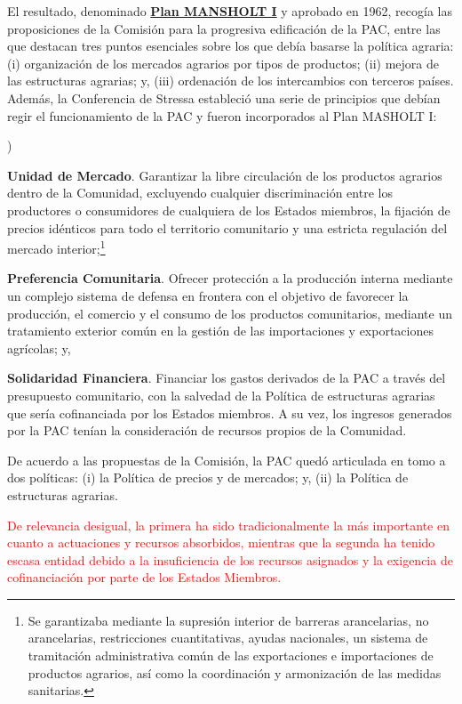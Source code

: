 \documentclass[10pt,a4paper]{article}
\newcounter{alphaitem}
\newenvironment{la}
      {\begin{list}{\alph{alphaitem})}{%
          \usecounter{alphaitem}%
          \setlength{\leftmargin}{1cm}%
          \setlength{\parskip}{3pt}%
          \setlength{\itemsep}{0pt}%
          \setlength{\parsep}{0pt}%
      }}
      {\end{list}}
\begin{document}
El resultado, denominado \href{https://www.mapa.gob.es/ministerio/pags/biblioteca/fondo/pdf/4102_10.pdf}{\textbf{Plan MANSHOLT I}} y aprobado en 1962, recogía las proposiciones de la Comisión para la progresiva edificación de la PAC, entre las que destacan tres puntos esenciales sobre los que debía basarse la política agraria: (i) organización de los mercados agrarios por tipos de productos; (ii) mejora de las estructuras agrarias; y, (iii) ordenación de los intercambios con terceros países. Además, la Conferencia de Stressa estableció una serie de principios que debían regir el funcionamiento de la PAC y fueron incorporados al Plan MASHOLT I:
\begin{la}
    \item \textbf{Unidad de Mercado}. Garantizar la libre circulación de los productos agrarios dentro de la Comunidad, excluyendo cualquier discriminación entre los productores o consumidores de cualquiera de los Estados miembros, la fijación de precios idénticos para todo el territorio comunitario y una estricta regulación del mercado interior;\footnote{%
        Se garantizaba mediante la supresión interior de barreras arancelarias, no arancelarias, restricciones cuantitativas, ayudas nacionales, un sistema de tramitación administrativa común de las exportaciones e importaciones de productos agrarios, así como la coordinación y armonización de las medidas sanitarias.
    }
    \item \textbf{Preferencia Comunitaria}. Ofrecer protección a la producción interna mediante un complejo sistema de defensa en frontera con el objetivo de favorecer la producción, el comercio y el consumo de los productos comunitarios, mediante un tratamiento exterior común en la gestión de las importaciones y exportaciones agrícolas; y,
    \item \textbf{Solidaridad Financiera}. Financiar los gastos derivados de la PAC a través del presupuesto comunitario, con la salvedad de la Política de estructuras agrarias que sería cofinanciada por los Estados miembros. A su vez, los ingresos generados por la PAC tenían la consideración de recursos propios de la Comunidad.
\end{la}

De acuerdo a las propuestas de la Comisión, la PAC quedó articulada en tomo a dos políticas: (i) la Política de precios y de mercados; y, (ii) la Política de estructuras agrarias. 

\textcolor{red}{De relevancia desigual, la primera ha sido tradicionalmente la más importante en cuanto a actuaciones y recursos absorbidos, mientras que la segunda ha tenido escasa entidad debido a la insuficiencia de los recursos asignados y la exigencia de cofinanciación por parte de los Estados Miembros.}
\end{document}
